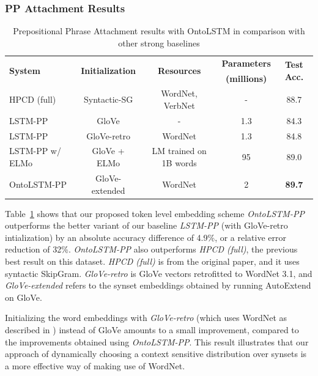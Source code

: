\subsubsection{PP Attachment Results}
\begin{table}
	\centering
	\begin{tabular}{lcccc}
		\toprule
		\multirow{2}{*}{\textbf{System}} &
		\multirow{2}{*}{\textbf{Initialization}} &
		\multirow{2}{*}{\textbf{Resources}} & \textbf{Parameters} & 
		\multirow{2}{*}{\textbf{Test Acc.}}\\
		& & & \textbf{(millions)} & \\
		\midrule
		HPCD (full) & Syntactic-SG & WordNet, VerbNet & - & 88.7 \\
		\midrule
		LSTM-PP & GloVe & - & 1.3 & 84.3 \\
		LSTM-PP & GloVe-retro & WordNet & 1.3 & 84.8 \\
		LSTM-PP w/ ELMo & GloVe + ELMo & LM trained on 1B words &
		95 & 89.0 \\
		OntoLSTM-PP & GloVe-extended & WordNet & 2 & \textbf{89.7} \\
		\bottomrule
	\end{tabular}
	\caption{Prepositional Phrase Attachment results with OntoLSTM in
	comparison with other strong baselines}\label{tab:ontolstm_direct_ppa_results}
\end{table}

Table~\ref{tab:ontolstm_direct_ppa_results} shows that our proposed token level
embedding scheme \textit{OntoLSTM-PP} outperforms the better variant of our
baseline \textit{LSTM-PP} (with GloVe-retro intialization) by an absolute
accuracy difference of 4.9\%, or a relative error reduction of 32\%.
\textit{OntoLSTM-PP} also outperforms \textit{HPCD (full)}, the previous best
result on this dataset. \textit{HPCD (full)} is from the original paper, and it
uses syntactic SkipGram. \textit{GloVe-retro} is GloVe vectors retrofitted
\citep{faruqui:15} to WordNet 3.1, and \textit{GloVe-extended} refers to the
synset embeddings obtained by running AutoExtend \citep{rothe:15} on GloVe.

Initializing the word embeddings with \textit{GloVe-retro} (which uses WordNet
as described in \cite{faruqui:15}) instead of GloVe amounts to a small
improvement, compared to the improvements obtained using \textit{OntoLSTM-PP}.
This result illustrates that our approach of dynamically choosing a context
sensitive distribution over synsets is a more effective way of making use of
WordNet.

